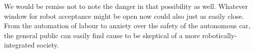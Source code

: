 \documentclass{sfuthesis}
\begin{document}
We would be remiss not to note the danger in that possibility as well. Whatever window for robot acceptance might be open now could also just as easily close. From the automation of labour to anxiety over the safety of the autonomous car, the general public can easily find cause to be skeptical of a more robotically-integrated society. 




















\end{document}
